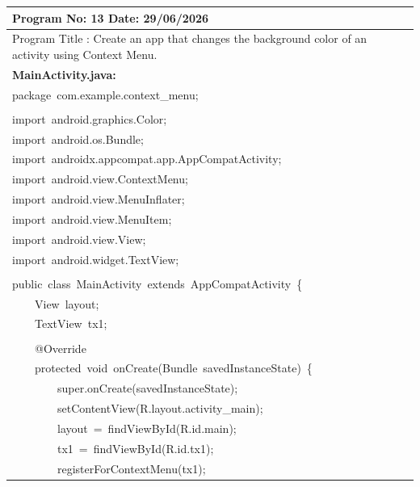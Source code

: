 \documentclass[a4paper,12pt]{article}
\begin{document}
\noindent\begingroup
\renewcommand{\arraystretch}{1.1}
\begin{longtable}{|p{}|}
\hline\endfirsthead\hline\endhead\hline\endfoot\hline\endlastfoot
\rule{0pt}{13pt}Program No: 13 \hfill Date: 29/06/2026 \\
\hline
\rule{0pt}{13pt}Program Title : Create an app that changes the background color of an activity using Context Menu. \\
\hline
\rule{0pt}{13pt}\textbf{MainActivity.java:} \\
\hline
{\ttfamily\small package\ com.example.context\_menu;} \\
\strut \\
{\ttfamily\small import\ android.graphics.Color;} \\
{\ttfamily\small import\ android.os.Bundle;} \\
{\ttfamily\small import\ androidx.appcompat.app.AppCompatActivity;} \\
{\ttfamily\small import\ android.view.ContextMenu;} \\
{\ttfamily\small import\ android.view.MenuInflater;} \\
{\ttfamily\small import\ android.view.MenuItem;} \\
{\ttfamily\small import\ android.view.View;} \\
{\ttfamily\small import\ android.widget.TextView;} \\
\strut \\
{\ttfamily\small public\ class\ MainActivity\ extends\ AppCompatActivity\ \{} \\
{\ttfamily\small \ \ \ \ View\ layout;} \\
{\ttfamily\small \ \ \ \ TextView\ tx1;} \\
\strut \\
{\ttfamily\small \ \ \ \ @Override} \\
{\ttfamily\small \ \ \ \ protected\ void\ onCreate(Bundle\ savedInstanceState)\ \{} \\
{\ttfamily\small \ \ \ \ \ \ \ \ super.onCreate(savedInstanceState);} \\
{\ttfamily\small \ \ \ \ \ \ \ \ setContentView(R.layout.activity\_main);} \\
{\ttfamily\small \ \ \ \ \ \ \ \ layout\ =\ findViewById(R.id.main);} \\
{\ttfamily\small \ \ \ \ \ \ \ \ tx1\ =\ findViewById(R.id.tx1);} \\
{\ttfamily\small \ \ \ \ \ \ \ \ registerForContextMenu(tx1);} \\

\end{longtable}
\end{document}
